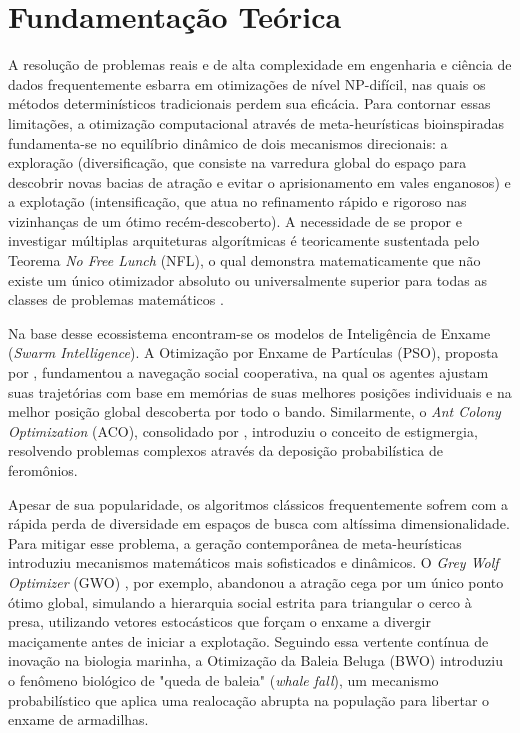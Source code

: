 \documentclass[12pt, a4paper, oneside]{report}
\begin{document}
\chapter{Fundamentação Teórica} \label{chap:fundamentacao}

A resolução de problemas reais e de alta complexidade em engenharia e ciência de dados frequentemente esbarra em otimizações de nível NP-difícil, nas quais os métodos determinísticos tradicionais perdem sua eficácia. Para contornar essas limitações, a otimização computacional através de meta-heurísticas bioinspiradas fundamenta-se no equilíbrio dinâmico de dois mecanismos direcionais: a exploração (diversificação, que consiste na varredura global do espaço para descobrir novas bacias de atração e evitar o aprisionamento em vales enganosos) e a explotação (intensificação, que atua no refinamento rápido e rigoroso nas vizinhanças de um ótimo recém-descoberto). A necessidade de se propor e investigar múltiplas arquiteturas algorítmicas é teoricamente sustentada pelo Teorema \textit{No Free Lunch} (NFL), o qual demonstra matematicamente que não existe um único otimizador absoluto ou universalmente superior para todas as classes de problemas matemáticos \citep{wolpert1997no}. 

Na base desse ecossistema encontram-se os modelos de Inteligência de Enxame (\textit{Swarm Intelligence}). A Otimização por Enxame de Partículas (PSO), proposta por \citet{kennedy1995particle}, fundamentou a navegação social cooperativa, na qual os agentes ajustam suas trajetórias com base em memórias de suas melhores posições individuais e na melhor posição global descoberta por todo o bando. Similarmente, o \textit{Ant Colony Optimization} (ACO), consolidado por \citet{dorigo2006ant}, introduziu o conceito de estigmergia, resolvendo problemas complexos através da deposição probabilística de feromônios.

Apesar de sua popularidade, os algoritmos clássicos frequentemente sofrem com a rápida perda de diversidade em espaços de busca com altíssima dimensionalidade. Para mitigar esse problema, a geração contemporânea de meta-heurísticas introduziu mecanismos matemáticos mais sofisticados e dinâmicos. O \textit{Grey Wolf Optimizer} (GWO) \citep{mirjalili2014grey}, por exemplo, abandonou a atração cega por um único ponto ótimo global, simulando a hierarquia social estrita para triangular o cerco à presa, utilizando vetores estocásticos que forçam o enxame a divergir maciçamente antes de iniciar a explotação. Seguindo essa vertente contínua de inovação na biologia marinha, a Otimização da Baleia Beluga (BWO) \citep{zhong2022beluga} introduziu o fenômeno biológico de "queda de baleia" (\textit{whale fall}), um mecanismo probabilístico que aplica uma realocação abrupta na população para libertar o enxame de armadilhas.
\end{document}
